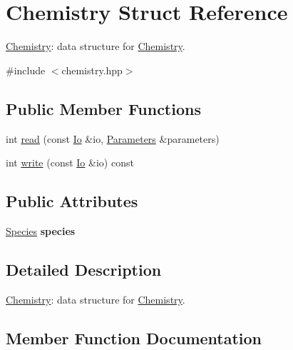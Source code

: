 \hypertarget{structChemistry}{}\section{Chemistry Struct Reference}
\label{structChemistry}


\mbox{\hyperlink{structChemistry}{Chemistry}}\+: data structure for \mbox{\hyperlink{structChemistry}{Chemistry}}.  




{\ttfamily \#include $<$chemistry.\+hpp$>$}

\subsection*{Public Member Functions}
\begin{DoxyCompactItemize}
\item 
int \mbox{\hyperlink{structChemistry_a217dd4c9fd5c34e4e0ad57fe5db2bb3a}{read}} (const \mbox{\hyperlink{structIo}{Io}} \&io, \mbox{\hyperlink{classParameters}{Parameters}} \&parameters)
\item 
int \mbox{\hyperlink{structChemistry_a6585d91621aa09b7f3e1b595f0f27f93}{write}} (const \mbox{\hyperlink{structIo}{Io}} \&io) const
\end{DoxyCompactItemize}
\subsection*{Public Attributes}
\begin{DoxyCompactItemize}
\item 
\mbox{\label{structChemistry_a40c2a3598226631f8ef665e092b361e1}} 
\mbox{\hyperlink{structSpecies}{Species}} {\bfseries species}
\end{DoxyCompactItemize}


\subsection{Detailed Description}
\mbox{\hyperlink{structChemistry}{Chemistry}}\+: data structure for \mbox{\hyperlink{structChemistry}{Chemistry}}. 

\subsection{Member Function Documentation}
\mbox{\label{structChemistry_a217dd4c9fd5c34e4e0ad57fe5db2bb3a}} 
